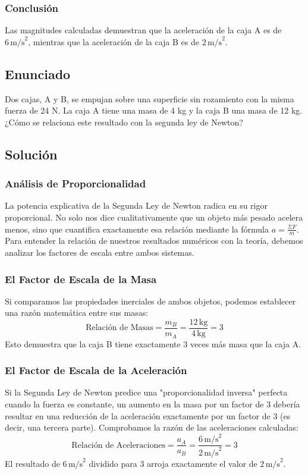 \documentclass[12pt]{article}
\begin{document}
\subsubsection*{Conclusión}
Las magnitudes calculadas demuestran que la aceleración de la caja A es de $6 \, \text{m/s}^2$, mientras que la aceleración de la caja B es de $2 \, \text{m/s}^2$.

\newpage

\subsection*{Enunciado}
Dos cajas, A y B, se empujan sobre una superficie sin rozamiento con la misma fuerza de 24 N. La caja A tiene una masa de 4 kg y la caja B una masa de 12 kg. ¿Cómo se relaciona este resultado con la segunda ley de Newton?

\subsection*{Solución}

\subsubsection*{Análisis de Proporcionalidad}
La potencia explicativa de la Segunda Ley de Newton radica en su rigor proporcional. No solo nos dice cualitativamente que un objeto más pesado acelera menos, sino que cuantifica exactamente esa relación mediante la fórmula $a = \frac{\Sigma F}{m}$. Para entender la relación de nuestros resultados numéricos con la teoría, debemos analizar los factores de escala entre ambos sistemas.

\subsubsection*{El Factor de Escala de la Masa}
Si comparamos las propiedades inerciales de ambos objetos, podemos establecer una razón matemática entre sus masas:
\begin{equation}
    \text{Relación de Masas} = \frac{m_B}{m_A} = \frac{12 \, \text{kg}}{4 \, \text{kg}} = 3
\end{equation}
Esto demuestra que la caja B tiene exactamente 3 veces más masa que la caja A.

\subsubsection*{El Factor de Escala de la Aceleración}
Si la Segunda Ley de Newton predice una "proporcionalidad inversa" perfecta cuando la fuerza es constante, un aumento en la masa por un factor de 3 debería resultar en una reducción de la aceleración exactamente por un factor de 3 (es decir, una tercera parte). Comprobamos la razón de las aceleraciones calculadas:
\begin{equation}
    \text{Relación de Aceleraciones} = \frac{a_A}{a_B} = \frac{6 \, \text{m/s}^2}{2 \, \text{m/s}^2} = 3
\end{equation}
El resultado de $6 \, \text{m/s}^2$ dividido para 3 arroja exactamente el valor de $2 \, \text{m/s}^2$. 
\end{document}
